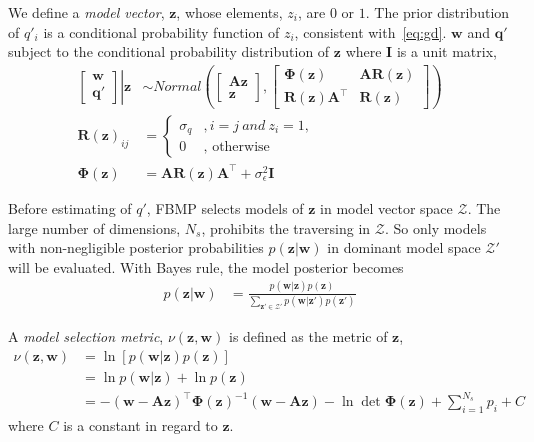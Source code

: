We define a \textit{model vector}, $\bm{z}$, whose elements, $z_i$, are $0$ or $1$. The prior distribution of $q'_i$ is a conditional probability function of $z_i$, consistent with~\eqref{eq:gd}. $\bm{w}$ and $\bm{q}'$ subject to the conditional probability distribution of $\bm{z}$ where $\bm{I}$ is a unit matrix,
\begin{equation}
\begin{aligned}
    \left.
    \begin{bmatrix}
        \bm{w} \\
        \bm{q}'
    \end{bmatrix}
    \right\vert\bm{z}
    &\sim Normal\left(
    \begin{bmatrix}
        \bm{A}\bm{z} \\
        \bm{z}
    \end{bmatrix}, 
    \begin{bmatrix}
        \bm{\Phi}(\bm{z}) & \bm{A}\bm{R}(\bm{z}) \\
        \bm{R}(\bm{z})\bm{A}^\top & \bm{R}(\bm{z})
    \end{bmatrix}
    \right) \\
    \bm{R}(\bm{z})_{ij} &= \left\{
    \begin{array}{ll}
      \sigma_q & , i=j\ and\ z_i = 1, \\
      0 & \mbox{, otherwise}
    \end{array}
    \right. \\
    \bm{\Phi}(\bm{z}) &= \bm{A}\bm{R}(\bm{z})\bm{A}^\top+\sigma_\epsilon^2\bm{I}
\end{aligned}
\end{equation}

Before estimating of $q'$, FBMP selects models of $\bm{z}$ in model vector space $\mathcal{Z}$. The large number of dimensions, $N_s$, prohibits the traversing in $\mathcal{Z}$. So only models with non-negligible posterior probabilities $p(\bm{z}|\bm{w})$ in dominant model space $\mathcal{Z}'$ will be evaluated. With Bayes rule, the model posterior becomes
\begin{align}
    p(\bm{z}|\bm{w}) &= \frac{p(\bm{w}|\bm{z})p(\bm{z})}{\sum_{\bm{z'}\in\mathcal{Z}'}p(\bm{w}|\bm{z'})p(\bm{z'})}
\end{align}

A \textit{model selection metric}, $\nu(\bm{z},\bm{w})$ is defined as the metric of $\bm{z}$, 
\begin{equation}
    \begin{aligned}
        \nu(\bm{z},\bm{w}) &= \ln[p(\bm{w}|\bm{z})p(\bm{z})] \\
        &= \ln p(\bm{w}|\bm{z}) + \ln p(\bm{z}) \\
        &= -(\bm{w}-\bm{A}\bm{z})^\top\bm{\Phi}(\bm{z})^{-1}(\bm{w}-\bm{A}\bm{z})-\ln\det\bm{\Phi}(\bm{z})+\sum_{i=1}^{N_s}p_i+C
    \end{aligned}
\end{equation}
where $C$ is a constant in regard to $\bm{z}$. 

